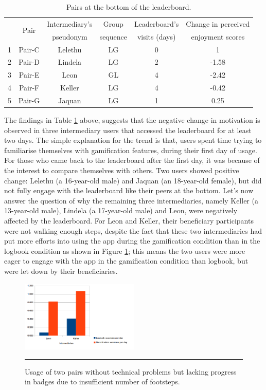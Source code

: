 \begin{table}[h!]
  \begin{center}
    \caption{Pairs at the bottom of the leaderboard.}
    \label{table:bottom}
	\begin{tabular}{|c|c|c|c|c|c|}
		\hline
		&\multirow{2}{*}{Pair}&Intermediary's  & Group &Leaderboard's& Change in perceived\\
         &&pseudonym&sequence&visits (days) &enjoyment scores\\	
		\hline
		1&Pair-C&Lelethu&LG&0&1\\
		\hline
		2&Pair-D&Lindela&LG&2&-1.58\\
		\hline
		3&Pair-E&Leon&GL&4&-2.42\\
		\hline
		4&Pair-F&Keller&LG&4&-0.42\\
	\hline
		5&Pair-G&Jaquan&LG&1&0.25\\
	\hline
	\end{tabular}
  \end{center}
\end{table}

The findings in Table \ref{table:bottom} above, suggests that the negative change in motivation is observed in three intermediary users that accessed the leaderboard for at least two days. The simple explanation for the trend is that, users spent time trying to familiarise themselves with gamification features, during their first day of usage. For those who came back to the leaderboard after the first day, it was because of the interest to compare themselves with others. Two users showed positive change: Lelethu (a 16-year-old male) and Jaquan (an 18-year-old female), but did not fully engage with the leaderboard like their peers at the bottom. Let's now answer the question of why the remaining three intermediaries, namely Keller (a 13-year-old male), Lindela (a 17-year-old male) and Leon, were negatively affected by the leaderboard. For Leon and Keller, their beneficiary participants were not walking enough steps, despite the fact that these two intermediaries had put more efforts into using the app during the gamification condition than in the logbook condition as shown in Figure \ref{figure:badge_failure_2}; this means the two users were more eager to engage with the app in the gamification condition than logbook, but were let down by their beneficiaries.  

\begin{figure}[htbp]
  \centering
    \includegraphics[width=0.5\textwidth]{Figures/badgesfailures2.png}
    \rule{35em}{0.5pt}
  \caption{Usage of two pairs without technical problems but lacking progress in badges due to insufficient number of footsteps.}
  \label{figure:badge_failure_2}
\end{figure}

